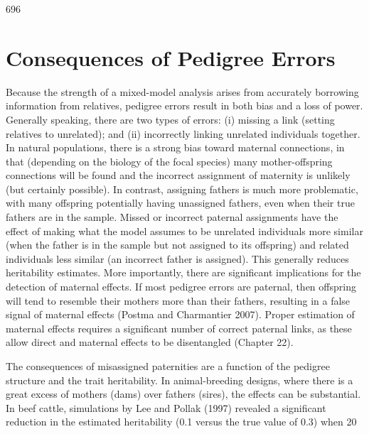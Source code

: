 \documentclass{article}
\begin{document}
696

\section{Consequences of Pedigree Errors}
Because the strength of a mixed-model analysis arises from accurately borrowing information from relatives, pedigree errors result in both bias and a loss of power. Generally speaking, there are two types of errors: (i) missing a link (setting relatives to unrelated); and (ii) incorrectly linking unrelated individuals together. In natural populations, there is a strong bias toward maternal connections, in that (depending on the biology of the focal species) many mother-offspring connections will be found and the incorrect assignment of maternity is unlikely (but certainly possible). In contrast, assigning fathers is much more problematic, with many offspring potentially having unassigned fathers, even when their true fathers are in the sample. Missed or incorrect paternal assignments have the effect of making what the model assumes to be unrelated individuals more similar (when the father is in the sample but not assigned to its offspring) and related individuals less similar (an incorrect father is assigned). This generally reduces heritability estimates. More importantly, there are significant implications for the detection of maternal effects. If most pedigree errors are paternal, then offspring will tend to resemble their mothers more than their fathers, resulting in a false signal of maternal effects (Postma and Charmantier 2007). Proper estimation of maternal effects requires a significant number of correct paternal links, as these allow direct and maternal effects to be disentangled (Chapter 22).

The consequences of misassigned paternities are a function of the pedigree structure and the trait heritability. In animal-breeding designs, where there is a great excess of mothers (dams) over fathers (sires), the effects can be substantial. In beef cattle, simulations by Lee and Pollak (1997) revealed a significant reduction in the estimated heritability (0.1 versus the true value of 0.3) when 20%
\end{document}
